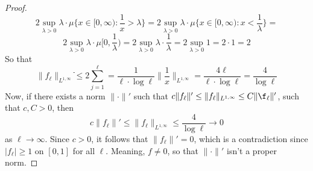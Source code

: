 \documentclass[12pt]{article}
\newenvironment{exercise}[2][Exercise]{\begin{trivlist}
\item[\hskip \labelsep {\bfseries #1}\hskip \labelsep {\bfseries #2.}]}{\end{trivlist}}
\begin{document}
\begin{proof}
  $$2 \sup_{\lambda > 0} \lambda \cdot \mu \Big \{x \in [0, \infty): \frac{1}{x} > \lambda \Big \} = 2 \sup_{\lambda > 0} \lambda \cdot \mu \Big \{x \in [0, \infty): x < \frac{1}{\lambda} \Big \} =$$
  $$2 \sup_{\lambda > 0} \lambda \cdot \mu[0, \frac{1}{\lambda}) = 2 \sup_{\lambda > 0} \lambda \cdot \frac{1}{\lambda} = 2 \sup_{\lambda > 0} 1  = 2  \cdot 1 = 2$$
  So that
  $$\|f_\ell\|_{L^{1, \infty}} ֿ\le 2 \sum_{j=1}^\ell = \frac{1}{\ell \cdot \log \ell} \|\frac{1}{x}\|_{L^{1, \infty}} = \frac{4 \ell}{\ell \cdot \log \ell} = \frac{4}{\log \ell}$$
  Now, if there exists a norm $\|\cdot\|'$ such that $c\|f_\ell\|' \le \|f_\ell\|_{L^{1, \infty}} \le C\|\f_\ell\|'$, such that $c,C > 0$, then
  $$c\|f_\ell\|' \le \|f_\ell\|_{L^{1, \infty}} \le \dfrac{4}{\log \ell} \rightarrow 0$$
  as $\ell \rightarrow \infty$. Since $c > 0$, it follows that $\|f_\ell\|' = 0$, which is a contradiction since $|f_\ell| \ge 1$ on $[0, 1]$ for all $\ell$. Meaning, $f \ne 0$, so  that $\|\cdot\|'$ isn't a proper  norm.
\end{proof}

\begin{exercise}{3}
\end{exercise}
\end{document}
